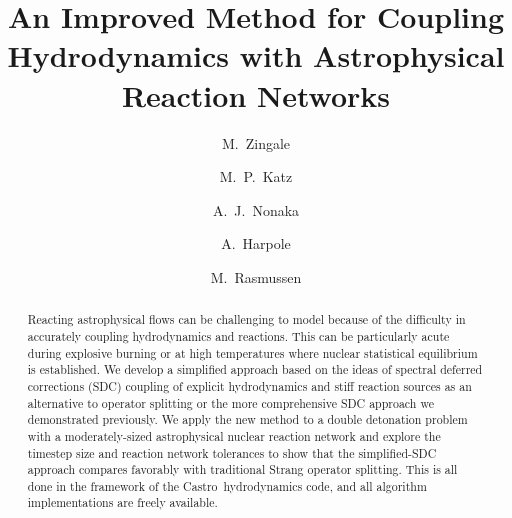 \documentclass[times,preprint]{aastex631}
\newcommand{\castro}{{\sf Castro}}
\begin{document}
\title{An Improved Method for Coupling Hydrodynamics with Astrophysical Reaction Networks}



\shortauthors{}

\author[0000-0001-8401-030X]{M.~Zingale}

\author[0000-0003-0439-4556]{M.~P.~Katz}

\author[0000-0003-1791-0265]{A.~J.~Nonaka}

\author[0000-0002-1530-781X]{A.~Harpole}

\author{M.~Rasmussen}



\begin{abstract}
Reacting astrophysical flows can be challenging to model because of
the difficulty in accurately coupling hydrodynamics and reactions.
This can be particularly acute during explosive burning or at high
temperatures where nuclear statistical equilibrium is established.  We
develop a simplified approach based on the ideas of spectral deferred
corrections (SDC) coupling of explicit hydrodynamics and stiff
reaction sources as an alternative to operator splitting or the more
comprehensive SDC approach we demonstrated previously.  We apply the
new method to a double detonation problem with a moderately-sized
astrophysical nuclear reaction network and explore the timestep size
and reaction network tolerances to show that the simplified-SDC
approach compares favorably with traditional Strang operator
splitting.  This is all done in the framework of the
\castro\ hydrodynamics code, and all algorithm implementations are
freely available.
\end{abstract}
\end{document}
